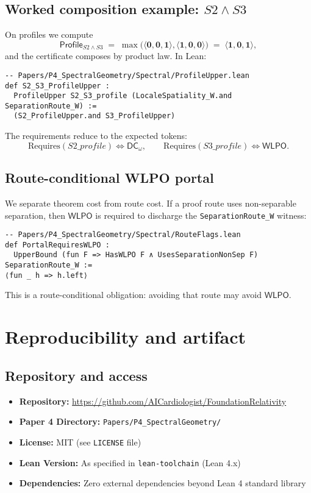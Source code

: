 \documentclass[11pt]{article}
\newcommand{\WLPO}{\mathsf{WLPO}}
\newcommand{\DCw}{\mathsf{DC}_{\omega}}
\newcommand{\hzero}{\mathbf{0}}
\newcommand{\hone}{\mathbf{1}}
\newcommand{\Profile}{\mathsf{Profile}}
\newcommand{\WLPOonly}{\langle \hone,\hzero,\hzero\rangle}
\newcommand{\DCwonly}{\langle \hzero,\hzero,\hone\rangle}
\newcommand{\lean}[1]{\texttt{#1}}
\theoremstyle{plain}
\theoremstyle{definition}
\theoremstyle{remark}
\begin{document}
\subsection{Worked composition example: \(S2 \wedge S3\)}
On profiles we compute
\[
  \Profile_{S2 \wedge S3}
  \;=\; \max\!\big(\DCwonly,\WLPOonly\big)
  \;=\; \langle \hone,\hzero,\hone\rangle,
\]
and the certificate composes by product law. In Lean:

\begin{lstlisting}
-- Papers/P4_SpectralGeometry/Spectral/ProfileUpper.lean
def S2_S3_ProfileUpper :
  ProfileUpper S2_S3_profile (LocaleSpatiality_W.and SeparationRoute_W) :=
  (S2_ProfileUpper.and S3_ProfileUpper)
\end{lstlisting}

The requirements reduce to the expected tokens:
\[
  \mathrm{Requires}(S2\_profile) \iff \DCw,\qquad
  \mathrm{Requires}(S3\_profile) \iff \WLPO.
\]

\subsection{Route-conditional WLPO portal}
We separate theorem cost from route cost. If a proof route uses non-separable
separation, then \(\WLPO\) is required to discharge the \lean{SeparationRoute\_W}
witness:

\begin{lstlisting}
-- Papers/P4_SpectralGeometry/Spectral/RouteFlags.lean
def PortalRequiresWLPO :
  UpperBound (fun F => HasWLPO F ∧ UsesSeparationNonSep F) SeparationRoute_W :=
⟨fun _ h => h.left⟩
\end{lstlisting}

This is a route-conditional obligation: avoiding that route may avoid \(\WLPO\).

\section{Reproducibility and artifact}

\subsection{Repository and access}
\begin{itemize}
\item \textbf{Repository:} \url{https://github.com/AICardiologist/FoundationRelativity}
\item \textbf{Paper 4 Directory:} \texttt{Papers/P4\_SpectralGeometry/}
\item \textbf{License:} MIT (see \texttt{LICENSE} file)
\item \textbf{Lean Version:} As specified in \texttt{lean-toolchain} (Lean 4.x)
\item \textbf{Dependencies:} Zero external dependencies beyond Lean 4 standard library
\end{itemize}
\end{document}

